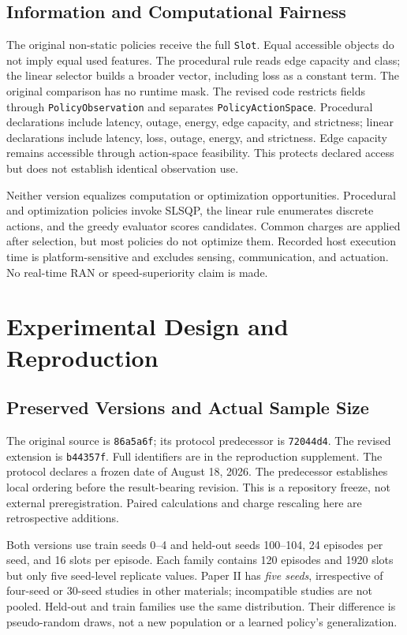 \documentclass[10pt,twocolumn]{article}
\newcommand{\pol}[1]{\texttt{#1}}
\begin{document}
\subsection{Information and Computational Fairness}
The original non-static policies receive the full \pol{Slot}. Equal accessible objects do not imply equal used features. The procedural rule reads edge capacity and class; the linear selector builds a broader vector, including loss as a constant term. The original comparison has no runtime mask. The revised code restricts fields through \pol{PolicyObservation} and separates \pol{PolicyActionSpace}. Procedural declarations include latency, outage, energy, edge capacity, and strictness; linear declarations include latency, loss, outage, energy, and strictness. Edge capacity remains accessible through action-space feasibility. This protects declared access but does not establish identical observation use.

Neither version equalizes computation or optimization opportunities. Procedural and optimization policies invoke SLSQP, the linear rule enumerates discrete actions, and the greedy evaluator scores candidates. Common charges are applied after selection, but most policies do not optimize them. Recorded host execution time is platform-sensitive and excludes sensing, communication, and actuation. No real-time RAN or speed-superiority claim is made.

\section{Experimental Design and Reproduction}
\subsection{Preserved Versions and Actual Sample Size}
The original source is \texttt{86a5a6f}; its protocol predecessor is \texttt{72044d4}. The revised extension is \texttt{b44357f}. Full identifiers are in the reproduction supplement. The protocol declares a frozen date of August 18, 2026. The predecessor establishes local ordering before the result-bearing revision. This is a repository freeze, not external preregistration. Paired calculations and charge rescaling here are retrospective additions.

Both versions use train seeds 0--4 and held-out seeds 100--104, 24 episodes per seed, and 16 slots per episode. Each family contains 120 episodes and 1920 slots but only five seed-level replicate values. Paper II has \emph{five seeds}, irrespective of four-seed or 30-seed studies in other materials; incompatible studies are not pooled. Held-out and train families use the same distribution. Their difference is pseudo-random draws, not a new population or a learned policy's generalization.
\end{document}
